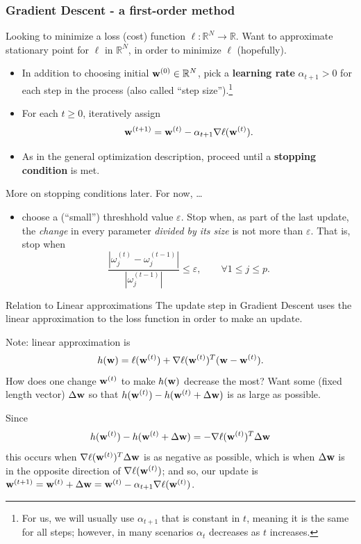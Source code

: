 \documentclass{beamer}
\begin{document}
\begin{frame}
\frametitle{Gradient Descent - a first-order method}
    Looking to minimize a loss (cost) function $\ell:\mathbb R^N \to \mathbb R$. Want to approximate stationary point for $\ell$ in $\mathbb R^N$, in order to minimize $\ell$ (hopefully). 

    \pause
    \begin{itemize}
        \item In addition to choosing initial ${\bf w}^{(0)}\in \mathbb R^N$, pick a \textbf{learning rate} $\alpha_{t+1} > 0$ for each step in the process (also called ``step size'').\footnote{For us, we will usually use $\alpha_{t+1}$ that is constant in $t$, meaning it is the same for all steps; however, in many scenarios $\alpha_t$ decreases as $t$ increases.} 
        \pause
        \item For each $t\ge 0$, iteratively assign
        \[{\bf w}^{(t+1)} = {\bf w}^{(t)} - \alpha_{t+1}\nabla\ell({\bf w}^{(t)}).\]
        \pause
        \item As in the general optimization description, proceed until a \textbf{stopping condition} is met.
    \end{itemize}

    \pause
    More on stopping conditions later. For now, \ldots 
    \pause
    \begin{itemize}
        \item choose a (``small'') threshhold value $\varepsilon$. Stop when, as part of the last update, the \emph{change} in every parameter \emph{divided by its size} is not more than $\varepsilon$. \pause That is, stop when 
        {\small
        \[\frac{|\omega^{(t)}_j - \omega^{(t-1)}_j|}{|\omega^{(t-1)}_j|} \le \varepsilon,\qquad \forall 1\le j\le p.\]
        }
    \end{itemize}
\end{frame}
\begin{frame}{Relation to Linear approximations}
    The update step in Gradient Descent uses the linear approximation to the loss function in order to make an update.

    \pause 
    Note: linear approximation is 
    \[h({\bf w}) = \ell({\bf w}^{(t)}) + \nabla\ell({\bf w}^{(t)})^T({\bf w} - {\bf w}^{(t)}).\]
    How does one change ${\bf w}^{(t)}$ to make $h({\bf w})$ decrease the most? Want some (fixed length vector) $\Delta{\bf w}$ so that $h({\bf w}^{(t)}) - h({\bf w}^{(t)}+\Delta{\bf w})$ is as large as possible.

    \pause
    Since \[h({\bf w}^{(t)}) - h({\bf w}^{(t)}+\Delta{\bf w}) = -\nabla\ell({\bf w}^{(t)})^T\Delta{\bf w}\]
    this occurs when $\nabla\ell({\bf w}^{(t)})^T\Delta{\bf w}$ is as negative as possible, which is when $\Delta{\bf w}$ is in the opposite direction of $\nabla\ell({\bf w}^{(t)})$; and so, our update is ${\bf w}^{(t+1)} = {\bf w}^{(t)}+\Delta{\bf w} = {\bf w}^{(t)}-\alpha_{t+1}\nabla\ell({\bf w}^{(t)})$.
\end{frame}
\end{document}
